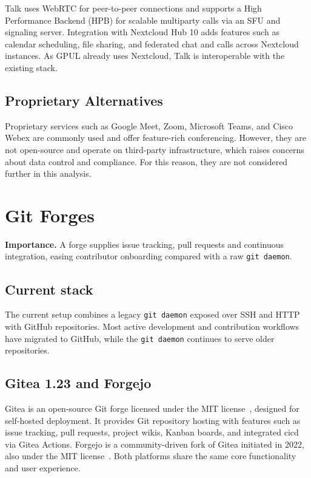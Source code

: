 Talk uses WebRTC for peer-to-peer connections and supports a High Performance Backend (HPB) for scalable multiparty calls via an SFU and signaling server. Integration with Nextcloud Hub 10 adds features such as calendar scheduling, file sharing, and federated chat and calls across Nextcloud instances. As GPUL already uses Nextcloud, Talk is interoperable with the existing stack.

\subsection{Proprietary Alternatives}

Proprietary services such as Google Meet, Zoom, Microsoft Teams, and Cisco Webex are commonly used and offer feature-rich conferencing. However, they are not open-source and operate on third-party infrastructure, which raises concerns about data control and compliance. For this reason, they are not considered further in this analysis.
\section{Git Forges}

\textbf{Importance.}  A forge supplies issue tracking, pull requests and continuous integration, easing contributor onboarding compared with a raw \texttt{git daemon}.

\subsection{Current stack}
The current setup combines a legacy \verb|git daemon| exposed over SSH and HTTP with GitHub repositories. Most active development and contribution workflows have migrated to GitHub, while the \texttt{git daemon} continues to serve older repositories.

\subsection{Gitea 1.23 and Forgejo}

Gitea is an open-source Git forge licensed under the MIT license~\cite{gitea-docs}, designed for self-hosted deployment. It provides Git repository hosting with features such as issue tracking, pull requests, project wikis, Kanban boards, and integrated \gls{cicd} via Gitea Actions. Forgejo is a community-driven fork of Gitea initiated in 2022, also under the MIT license~\cite{forgejo-docs}. Both platforms share the same core functionality and user experience.

